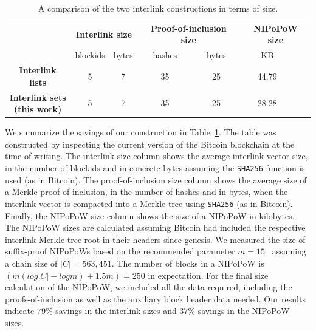 
\begin{table}[h!]
  \begin{center}
    \begin{tabular}{|c|cc|cc|cc|}
      \hline
      & \multicolumn{2}{c|}{\bf Interlink size}
      & \multicolumn{2}{c|}{\bf Proof-of-inclusion size}
      & \multicolumn{2}{c|}{\bf NIPoPoW size}\\
      & blockids & bytes & hashes & bytes & KB\\
      \hhline{-------}
      \textbf{Interlink lists}&
      5 & 7 & 35 & 25 & 44.79\\
      \hline
      \makecell{\bf Interlink sets\\(this work)}&
      5 & 7 & 35 & 25 & 28.28\\
      \hline
    \end{tabular}
    \vspace{10pt}
    \caption{A comparison of the two interlink constructions in terms of size.}
    \label{tab.savings}
  \end{center}
\end{table}

We summarize the savings of our construction in Table~\ref{tab.savings}. The
table was constructed by inspecting the current version of the Bitcoin
blockchain at the time of writing. The interlink size column shows the average
interlink vector size, in the number of blockids and in concrete bytes assuming
the \texttt{SHA256} function is used (as in Bitcoin). The proof-of-inclusion
size column shows the average size of a Merkle proof-of-inclusion, in the number
of hashes and in bytes, when the interlink vector is compacted into a Merkle
tree using \texttt{SHA256} (as in Bitcoin). Finally, the NIPoPoW size column
shows the size of a NIPoPoW in kilobytes. The NIPoPoW sizes are calculated
assuming Bitcoin had included the respective interlink Merkle tree root in their
headers since genesis. We measured the size of suffix-proof NIPoPoWs based on
the recommended parameter $m = 15$~\cite{nipopows} assuming a chain size of $|C|
= 563{,}451$. The number of blocks in a NIPoPoW is $(m(log |C| − log m) + 1.5m)
= 250$ in expectation. For the final size calculation of the NIPoPoW, we
included all the data required, including the proofs-of-inclusion as well as the
auxiliary block header data needed. Our results indicate $79\%$ savings in the
interlink sizes and $37\%$ savings in the NIPoPoW sizes.
